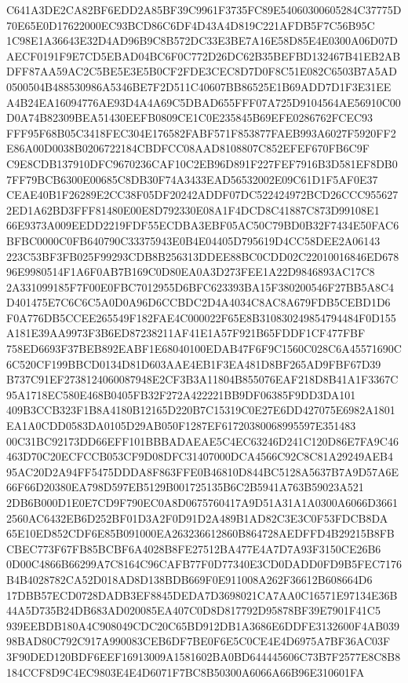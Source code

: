 \documentclass[UTF8,fontset=fandol,zihao=-4,a4paper]{ctexart}
\begin{document}
{{C641A3DE2CA82BF6EDD2A85BF39C9961F3735FC89E54060300605284C37775D70E65E0D17622000EC93BCD86C6DF4D43A4D819C221AFDB5F7C56B95C
1C98E1A36643E32D4AD96B9C8B572DC33E3BE7A16E58D85E4E0300A06D07DAECF0191F9E7CD5EBAD04BC6F0C772D26DC62B35BEFBD132467B41EB2AB
DFF87AA59AC2C5BE5E3E5B0CF2FDE3CEC8D7D0F8C51E082C6503B7A5AD0500504B488530986A5346BE7F2D511C40607BB86525E1B69ADD7D1F3E31EE
A4B24EA16094776AE93D4A4A69C5DBAD655FFF07A725D9104564AE56910C00D0A74B82309BEA51430EEFB0809CE1C0E235845B69EFE0286762FCEC93
FFF95F68B05C3418FEC304E176582FABF571F853877FAEB993A6027F5920FF2E86A00D0038B0206722184CBDFCC08AAD8108807C852EFEF670FB6C9F
C9E8CDB137910DFC9670236CAF10C2EB96D891F227FEF7916B3D581EF8DB07FF79BCB6300E00685C8DB30F74A3433EAD56532002E09C61D1F5AF0E37
CEAE40B1F26289E2CC38F05DF20242ADDF07DC522424972BCD26CCC9556272ED1A62BD3FFF81480E00E8D792330E08A1F4DCD8C41887C873D99108E1
66E9373A009EEDD2219FDF55ECDBA3EBF05AC50C79BD0B32F7434E50FAC6BFBC0000C0FB640790C33375943E0B4E04405D795619D4CC58DEE2A06143
223C53BF3FB025F99293CDB8B256313DDEE88BC0CDD02C22010016846ED67896E9980514F1A6F0AB7B169C0D80EA0A3D273FEE1A22D9846893AC17C8
2A331099185F7F00E0FBC7012955D6BFC623393BA15F380200546F27BB5A8C4D401475E7C6C6C5A0D0A96D6CCBDC2D4A4034C8AC8A679FDB5CEBD1D6
F0A776DB5CCEE265549F182FAE4C000022F65E8B310830249854794484F0D155A181E39AA9973F3B6ED87238211AF41E1A57F921B65FDDF1CF477FBF
758ED6693F37BEB892EABF1E68040100EDAB47F6F9C1560C028C6A45571690C6C520CF199BBCD0134D81D603AAE4EB1F3EA481D8BF265AD9FBF67D39
B737C91EF2738124060087948E2CF3B3A11804B855076EAF218D8B41A1F3367C95A1718EC580E468B0405FB32F272A422221BB9DF06385F9DD3DA101
409B3CCB323F1B8A4180B12165D220B7C15319C0E27E6DD427075E6982A1801EA1A0CDD0583DA0105D29AB050F1287EF61720380068995597E351483
00C31BC92173DD66EFF101BBBADAEAE5C4EC63246D241C120D86E7FA9C46463D70C20ECFCCB053CF9D08DFC31407000DCA4566C92C8C81A29249AEB4
95AC20D2A94FF5475DDDA8F863FFE0B46810D844BC5128A5637B7A9D57A6E66F66D20380EA798D597EB5129B001725135B6C2B5941A763B59023A521
2DB6B000D1E0E7CD9F790EC0A8D0675760417A9D51A31A1A0300A6066D36612560AC6432EB6D252BF01D3A2F0D91D2A489B1AD82C3E3C0F53FDCB8DA
65E10ED852CDF6E85B091000EA263236612860B864728AEDFFD4B29215B8FBCBEC773F67FB85BCBF6A4028B8FE27512BA477E4A7D7A93F3150CE26B6
0D00C4866B66299A7C8164C96CAFB77F0D77340E3CD0DADD0FD9B5FEC7176B4B4028782CA52D018AD8D138BDB669F0E911008A262F36612B608664D6
17DBB57ECD0728DADB3EF8845DEDA7D3698021CA7AA0C16571E97134E36B44A5D735B24DB683AD020085EA407C0D8D817792D95878BF39E7901F41C5
939EEBDB180A4C908049CDC20C65BD912DB1A3686E6DDFE3132600F4AB03998BAD80C792C917A990083CEB6DF7BE0F6E5C0CE4E4D6975A7BF36AC03F
3F90DED120BDF6EEF16913009A1581602BA0BD644445606C73B7F2577E8C8B8184CCF8D9C4EC9803E4E4D6071F7BC8B50300A6066A66B96E310601FA
}}
\end{document}
